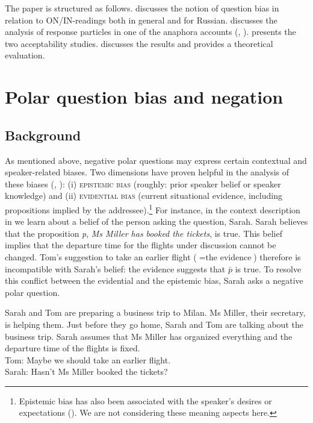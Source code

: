 \documentclass[output=paper,colorlinks,citecolor=brown]{langscibook}
\begin{document}
The paper is structured as follows.  discusses the notion of question bias in relation to ON/IN-readings both in general and for Russian.  discusses the analysis of response particles in one of the anaphora accounts (\citealt{RoelofsenFarkas2015}, \citealt{FarkasRoelofsen2019}).  presents the two acceptability studies.  discusses the results and provides a theoretical evaluation.

\section{Polar question bias and negation}\label{geist-repp-polarQuestionBias}

\subsection{Background}\label{geist-repp:sec:background}

As mentioned above, negative polar questions may express certain contextual and speaker-related biases. Two dimensions have proven helpful in the analysis of these biases (\citealt{Sudo2013}, \citealt{GaertnerGyuris2017}): (i) \textsc{epistemic bias} (roughly: prior speaker belief or speaker knowledge) and (ii) \textsc{evidential bias} (current situational evidence, including propositions implied by the addressee).\footnote{Epistemic bias has also been associated with the speaker’s desires or expectations (\citealt{Sudo2013}). We are not considering these meaning aspects here.} For instance, in the context description in  we learn about a belief of the person asking the question, Sarah. Sarah believes that the proposition \textit{p}, \textit{Ms Miller has booked the tickets}, is true. This belief implies that the departure time for the flights under discussion cannot be changed. Tom’s suggestion to take an earlier flight ($=\text{the evidence}$) therefore is incompatible with Sarah’s belief: the evidence suggests that $\bar{p}$  is true. To resolve this conflict between the evidential and the epistemic bias, Sarah asks a negative polar question. 

\eanoraggedright\label{geist-repp:ex:sarah-tom}
Sarah and Tom are preparing a business trip to Milan. Ms Miller, their secretary, is helping them. Just before they go home, Sarah and Tom are talking about the business trip. Sarah assumes that Ms Miller has organized everything and the departure time of the flights is fixed.\\[6pt]
    Tom: \tabto{1.7cm}Maybe we should take an earlier flight.\\[3pt]
    Sarah: \tabto{1.7cm}Hasn’t Ms Miller booked the tickets?
\z
\end{document}
